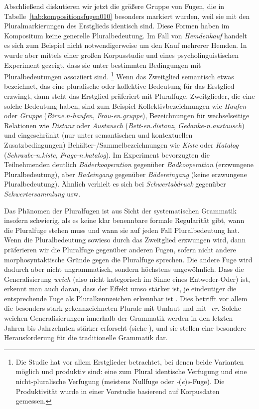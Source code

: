 Abschließend diskutieren wir jetzt die größere Gruppe von Fugen, die in Tabelle~\ref{tab:kompositionsfugen010} besonders markiert wurden, weil sie mit den Pluralmarkierungen des Erstglieds identisch sind.
Diese Formen haben im Kompositum keine generelle Pluralbedeutung.
Im Fall von \textit{Hemdenkauf} handelt es sich zum Beispiel nicht notwendigerweise um den Kauf mehrerer Hemden.
In \citet{SchaeferPankratz2018} wurde aber mittels einer großen Korpusstudie und eines psycholinguistischen Experiment gezeigt, dass sie unter bestimmten Bedingungen mit Pluralbedeutungen assoziiert sind.%
\footnote{Die Studie hat vor allem Erstglieder betrachtet, bei denen beide Varianten möglich und produktiv sind:
eine zum Plural identische Verfugung und eine nicht-pluralische Verfugung (meistens Nullfuge oder \textit{-}(\textit{e})\textit{s}-Fuge).
Die Produktivität wurde in einer Vorstudie basierend auf Korpusdaten gemessen.}
Wenn das Zweitglied semantisch etwas bezeichnet, das eine pluralische oder kollektive Bedeutung für das Erstglied erzwingt, dann steht das Erstglied präferiert mit Pluralfuge.
Zweitglieder, die eine solche Bedeutung haben, sind zum Beispiel Kollektivbezeichnungen wie \textit{Haufen} oder \textit{Gruppe} (\zB \textit{Birne.n-haufen}, \textit{Frau-en.gruppe}), Bezeichnungen für wechselseitige Relationen wie \textit{Distanz} oder \textit{Austausch} (\zB \textit{Bett-en.distanz}, \textit{Gedanke-n.austausch}) und eingeschränkt (nur unter semantischen und kontextuellen Zusatzbedingungen) Behälter-\slash Sammelbezeichnungen wie \textit{Kiste} oder \textit{Katalog} (\zB \textit{Schraube-n.kiste}, \textit{Frage-n.katalog}).
Im Experiment bevorzugten die Teilnehmenden deutlich \textit{Bäderkooperation} gegenüber \textit{Badkooperation} (erzwungene Pluralbedeutung), aber \textit{Badeingang} gegenüber \textit{Bädereingang} (keine erzwungene Pluralbedeutung).
Ähnlich verhielt es sich bei \textit{Schwertabdruck} gegenüber \textit{Schwertersammlung} usw.

Das Phänomen der Pluralfugen ist aus Sicht der systematischen Grammatik insofern schwierig, als es keine klar benennbare formale Regularität gibt, wann die Pluralfuge stehen muss und wann sie auf jeden Fall Pluralbedeutung hat.
Wenn die Pluralbedeutung sowieso durch das Zweitglied erzwungen wird, dann präferieren wir die Pluralfuge gegenüber anderen Fugen, sofern nicht andere morphosyntaktische Gründe gegen die Pluralfuge sprechen.
Die andere Fuge wird dadurch aber nicht ungrammatisch, sondern höchstens ungewöhnlich.
Dass die Generalisierung \textit{weich}\label{abs:weich} (also nicht kategorisch im Sinne eines Entweder-Oder) ist, erkennt man auch daran, dass der Effekt umso stärker ist, je eindeutiger die entsprechende Fuge als Pluralkennzeichen erkennbar ist \citep{SchaeferPankratz2018}.
Dies betrifft vor allem die besonders stark gekennzeichneten Plurale mit Umlaut und mit \textit{-er}.
Solche weichen Generalisierungen innerhalb der Grammatik werden in den letzten Jahren bis Jahrzehnten stärker erforscht (siehe \citealt{Schaefer2018a}), und sie stellen eine besondere Herausforderung für die traditionelle Grammatik dar.

